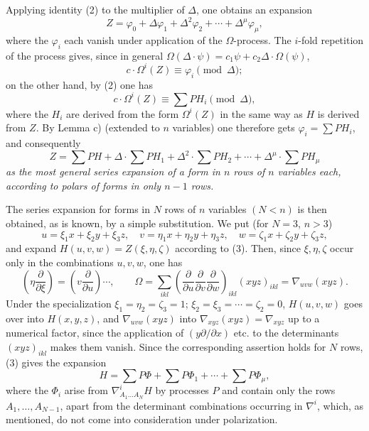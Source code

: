 Applying identity (2) to the multiplier of $\Delta$, one obtains an expansion
\[
  Z=\varphi_0+\Delta\varphi_1+\Delta^2\varphi_2+\cdots+\Delta^\mu\varphi_\mu,
\]
where the $\varphi_i$ each vanish under application of the $\Omega$-process. The $i$-fold repetition of the process gives, since in general $\Omega(\Delta\cdot\psi)=c_1\psi+c_2\Delta\cdot\Omega(\psi)$,
\[
  c\cdot \Omega^i(Z)\equiv\varphi_i\pmod{\Delta};
\]
on the other hand, by (2) one has
\[
  c\cdot\Omega^i(Z)\equiv\sum PH_i\pmod{\Delta},
\]
where the $H_i$ are derived from the form $\Omega^i(Z)$ in the same way as $H$ is derived from $Z$. By Lemma c) (extended to $n$ variables) one therefore gets $\varphi_i=\sum PH_i$, and consequently
\begin{equation}
  Z=\sum PH+\Delta\cdot\sum PH_1+\Delta^2\cdot\sum PH_2+
  \cdots+\Delta^\mu\cdot\sum PH_\mu
\tag{3}
\end{equation}
\emph{as the most general series expansion of a form in $n$ rows of $n$ variables each, according to polars of forms in only $n-1$ rows.}

The series expansion for forms in $N$ rows of $n$ variables $(N<n)$ is then obtained, as is known, by a simple substitution. We put (for $N=3$, $n>3$)
\[
  u=\xi_1x+\xi_2y+\xi_3z,
  \quad v=\eta_1x+\eta_2y+\eta_3z,
  \quad w=\zeta_1x+\zeta_2y+\zeta_3z,
\]
and expand $H(u,v,w)=Z(\xi,\eta,\zeta)$ according to (3). Then, since $\xi,\eta,\zeta$ occur only in the combinations $u,v,w$, one has
\[
  \left(\eta\frac{\partial}{\partial \xi}\right)=
  \left(v\frac{\partial}{\partial u}\right)\cdots,
  \qquad
  \Omega=\sum_{ikl}\left(\frac{\partial}{\partial u}
  \frac{\partial}{\partial v}
  \frac{\partial}{\partial w}\right)_{ikl}(xyz)_{ikl}
  =\nabla_{uvw}(xyz).
\]
Under the specialization $\xi_1=\eta_2=\zeta_3=1$; $\xi_2=\xi_3=\cdots=\zeta_2=0$, $H(u,v,w)$ goes over into $H(x,y,z)$, and $\nabla_{uvw}(xyz)$ into $\nabla_{xyz}(xyz)=\nabla_{xyz}$ up to a numerical factor, since the application of $(y\partial/\partial x)$ etc. to the determinants $(xyz)_{ikl}$ makes them vanish. Since the corresponding assertion holds for $N$ rows, (3) gives the expansion
\begin{equation}
  H=\sum P\Phi+\sum P\Phi_1+\cdots+\sum P\Phi_\mu,
\tag{4}
\end{equation}
where the $\Phi_i$ arise from $\nabla^i_{A_1\ldots A_N}H$ by processes $P$ and contain only the rows $A_1,
\ldots,A_{N-1}$, apart from the determinant combinations occurring in $\nabla^i$, which, as mentioned, do not come into consideration under polarization.

